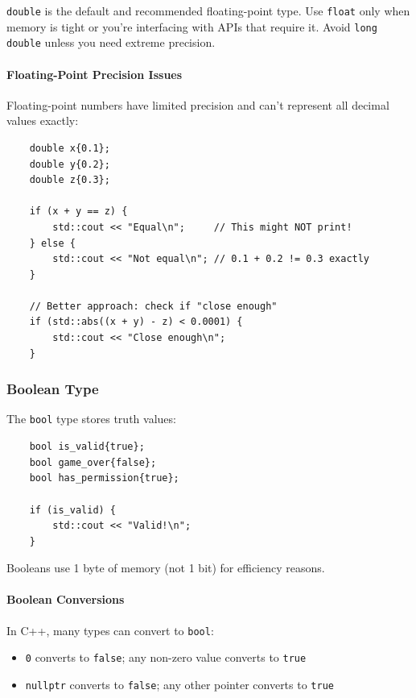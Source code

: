 \begin{remark}
	\texttt{double} is the default and recommended floating-point type. Use \texttt{float} only when memory is tight or you're interfacing with APIs that require it. Avoid \texttt{long double} unless you need extreme precision.
\end{remark}

\paragraph{Floating-Point Precision Issues}

Floating-point numbers have limited precision and can't represent all decimal values exactly:

\begin{lstlisting}
	double x{0.1};
	double y{0.2};
	double z{0.3};
	
	if (x + y == z) {
		std::cout << "Equal\n";     // This might NOT print!
	} else {
		std::cout << "Not equal\n"; // 0.1 + 0.2 != 0.3 exactly
	}
	
	// Better approach: check if "close enough"
	if (std::abs((x + y) - z) < 0.0001) {
		std::cout << "Close enough\n";
	}
\end{lstlisting}

\subsubsection{Boolean Type}

The \texttt{bool} type stores truth values:

\begin{lstlisting}
	bool is_valid{true};
	bool game_over{false};
	bool has_permission{true};
	
	if (is_valid) {
		std::cout << "Valid!\n";
	}
\end{lstlisting}

Booleans use 1 byte of memory (not 1 bit) for efficiency reasons.

\paragraph{Boolean Conversions}

In C++, many types can convert to \texttt{bool}:
\begin{itemize}
	\item \texttt{0} converts to \texttt{false}; any non-zero value converts to \texttt{true}
	\item \texttt{nullptr} converts to \texttt{false}; any other pointer converts to \texttt{true}
\end{itemize}

